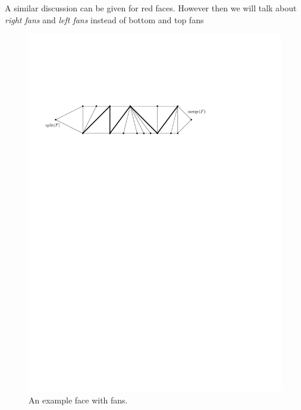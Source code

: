      A similar discussion can be given for red faces. However then we will talk about \emph{right fans} and \emph{left fans} instead of bottom and top fans

     \begin{figure}[h]
       \centering
       \includegraphics[scale=.9]{rectangularDuals/img/fans}
       \caption{An example face with fans.}
       \label{fig:uni:fans}
     \end{figure}

